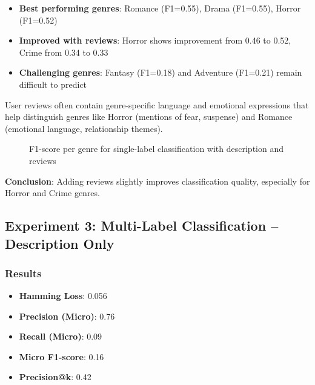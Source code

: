 \documentclass[12pt,a4paper]{article}
\begin{document}
\begin{itemize}
    \item \textbf{Best performing genres}: Romance (F1=0.55), Drama (F1=0.55), Horror (F1=0.52)
    \item \textbf{Improved with reviews}: Horror shows improvement from 0.46 to 0.52, Crime from 0.34 to 0.33
    \item \textbf{Challenging genres}: Fantasy (F1=0.18) and Adventure (F1=0.21) remain difficult to predict
\end{itemize}

User reviews often contain genre-specific language and emotional expressions that help distinguish genres like Horror (mentions of fear, suspense) and Romance (emotional language, relationship themes).

\begin{figure}[h]
\centering
{}
\caption{F1-score per genre for single-label classification with description and reviews}
\label{fig:exp2_per_class}
\end{figure}

\textbf{Conclusion}: Adding reviews slightly improves classification quality, especially for Horror and Crime genres.

\subsection{Experiment 3: Multi-Label Classification -- Description Only}

\subsubsection{Results}

\begin{itemize}

    \item \textbf{Hamming Loss}: 0.056

    \item \textbf{Precision (Micro)}: 0.76

    \item \textbf{Recall (Micro)}: 0.09

    \item \textbf{Micro F1-score}: 0.16

    \item \textbf{Precision@k}: 0.42

\end{itemize}
\end{document}
